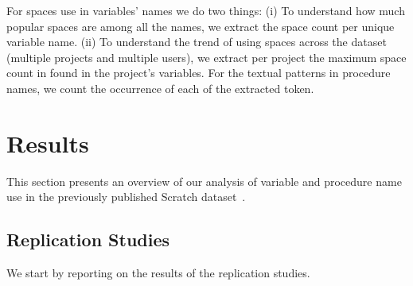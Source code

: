 \documentclass[conference]{IEEEtran}
\begin{document}
For spaces use in variables' names we do two things: (i) To understand how much popular spaces are among all the names, we extract the space count per unique variable name. (ii) To understand the trend of using spaces across the dataset (multiple projects and multiple users), we extract per project the maximum space count in found in the project's variables. For the textual patterns in procedure names, we count the occurrence of each of the extracted token. 


 \section{Results}
This section presents an overview of our analysis of variable and procedure name use in the previously published Scratch dataset~\cite{Aivaloglou2016HowKC}.

\subsection{Replication Studies}
We start by reporting on the results of the replication studies.
\end{document}
